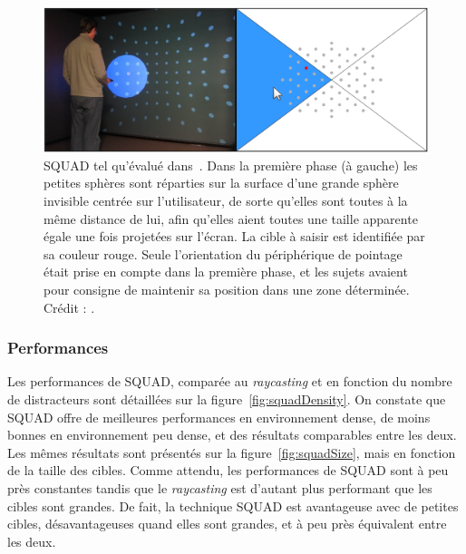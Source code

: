 	\begin{figure}[!htb]
		\centering
		\includegraphics[width=\textwidth]{figures/ch2/squad2}
		\caption[La technique SQUAD -- évaluation]{SQUAD tel qu'évalué dans~\cite{kopper2011rapid}. Dans la première phase (à gauche) les petites sphères sont réparties sur la surface d'une grande sphère invisible centrée sur l'utilisateur, de sorte qu'elles sont toutes à la même distance de lui, afin qu'elles aient toutes une taille apparente égale une fois projetées sur l'écran. La cible à saisir est identifiée par sa couleur rouge. Seule l'orientation du périphérique de pointage était prise en compte dans la première phase, et les sujets avaient pour consigne de maintenir sa position dans une zone déterminée. Crédit : \cite{kopper2011rapid}.}
		\label{fig:squad2}
	\end{figure}
	
	\subsubsection{Performances}
	Les performances de SQUAD, comparée au \emph{raycasting} et en fonction du nombre de distracteurs sont détaillées sur la figure~\ref{fig:squadDensity}. On constate que SQUAD offre de meilleures performances en environnement dense, de moins bonnes en environnement peu dense, et des résultats comparables entre les deux. Les mêmes résultats sont présentés sur la figure~\ref{fig:squadSize}, mais en fonction de la taille des cibles. Comme attendu, les performances de SQUAD sont à peu près constantes tandis que le \emph{raycasting} est d'autant plus performant que les cibles sont grandes. De fait, la technique SQUAD est avantageuse avec de petites cibles, désavantageuses quand elles sont grandes, et à peu près équivalent entre les deux.
	
